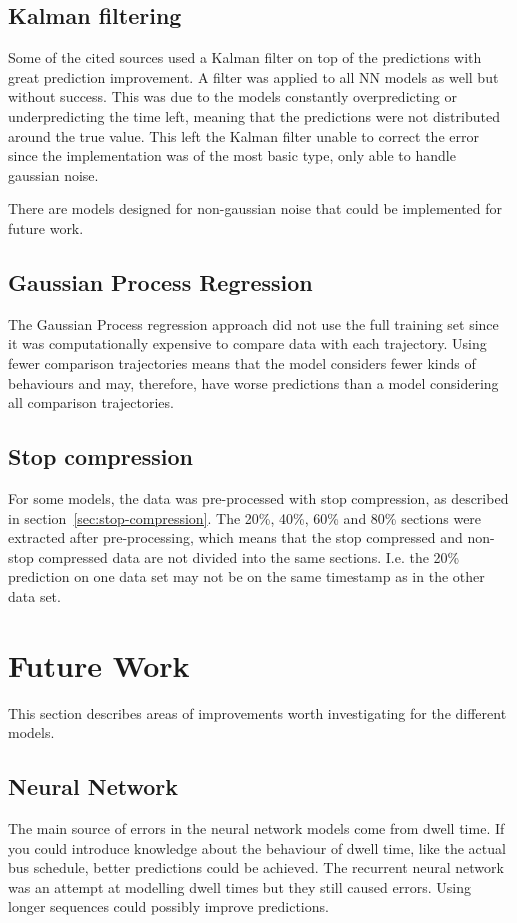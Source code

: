 \subsection{Kalman filtering}
Some of the cited sources used a Kalman filter on top of the predictions with great prediction improvement. A filter was applied to all NN models as well but without success. This was due to the models constantly overpredicting or underpredicting the time left, meaning that the predictions were not distributed around the true value. This left the Kalman filter unable to correct the error since the implementation was of the most basic type, only able to handle gaussian noise. 

There are models designed for non-gaussian noise that could be implemented for future work.

\subsection{Gaussian Process Regression}
The Gaussian Process regression approach did not use the full training set since it was computationally expensive to compare data with each trajectory. Using fewer comparison trajectories means that the model considers fewer kinds of behaviours and may, therefore, have worse predictions than a model considering all comparison trajectories.

\subsection{Stop compression}
For some models, the data was pre-processed with stop compression, as described in section~\ref{sec:stop-compression}. The 20\%, 40\%, 60\% and 80\% sections were extracted after pre-processing, which means that the stop compressed and non-stop compressed data are not divided into the same sections. I.e. the 20\% prediction on one data set may not be on the same timestamp as in the other data set.

\section{Future Work}
\label{sec:future-work}
This section describes areas of improvements worth investigating for the different models.

\subsection{Neural Network}
The main source of errors in the neural network models come from dwell time. If you could introduce knowledge about the behaviour of dwell time, like the actual bus schedule, better predictions could be achieved. The recurrent neural network was an attempt at modelling dwell times but they still caused errors. Using longer sequences could possibly improve predictions.

